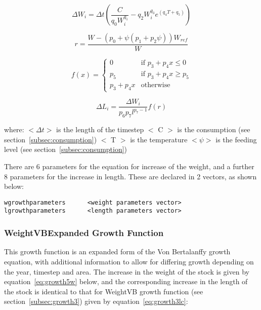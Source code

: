\documentclass [a4paper, 10pt]{book}
\begin{document}
\begin{equation}\label{eq:growth4w}
\Delta W_{i} = \Delta t \left( \frac{C}{q_{0} W_{i}^{q_{1}}} - q_{2} W_{i}^{q_{3}} e^{(q_{4} T + q_{5})} \right)
\end{equation}

\begin{equation}\label{eq:growth4la}
 r = \frac{W - \left( p_{0} + \psi \left( p_{1} + p_{2}\psi \right) \right) W_{ref}}{W}
\end{equation}

\begin{equation}\label{eq:growth4lb}
f(x) =
\begin{cases}
  0
  & \textrm{if $p_{3} + p_{4}x \leq 0$} \\
  p_{5}
  & \textrm{if $p_{3} + p_{4}x \geq p_{5}$} \\
  p_{3} + p_{4}x
  & \textrm{otherwise}
\end{cases}
\end{equation}

\begin{equation}\label{eq:growth4lc}
\Delta L_{i} = \frac{\Delta W_{i}} {p_{6} p_{7} l^{p_{7} - 1}} f(r)
\end{equation}

where:\newline
$<\Delta t>$ is the length of the timestep\newline
$<$ C $>$ is the consumption (see section~\ref{subsec:consumption})\newline
$<$ T $>$ is the temperature\newline
$<\psi>$ is the feeding level (see section~\ref{subsec:consumption})

\bigskip
There are 6 parameters for the equation for increase of the weight, and a further 8 parameters for the increase in length.  These are declared in 2 vectors, as shown below:

{\small\begin{verbatim}
wgrowthparameters      <weight parameters vector>
lgrowthparameters      <length parameters vector>
\end{verbatim}}

\subsubsection{WeightVBExpanded Growth Function}\label{subsec:growth5}
This growth function is an expanded form of the Von Bertalanffy growth equation, with additional information to allow for differing growth depending on the year, timestep and area.  The increase in the weight of the stock is given by equation~\ref{eq:growth5w} below, and the corresponding increase in the length of the stock is identical to that for WeightVB growth function (see section~\ref{subsec:growth3}) given by equation~\ref{eq:growth3lc}:
\end{document}

